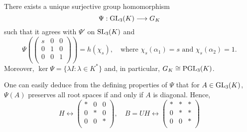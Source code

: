 \begin{theorem}
    There exists a unique surjective group homomorphism $$\Psi:\mathrm{GL}_3(K)\longrightarrow G_K$$ such that it agrees with $\Psi'$ on $\SL_3(K)$ and 
    $$\Psi\left(\begin{pmatrix}
        s & 0 & 0\\
        0 & 1 & 0\\
        0 & 0 & 1\\
    \end{pmatrix}\right)=h(\chi_s),\quad\text{where }\chi_s(\alpha_1)=s\text{ and }\chi_s(\alpha_2)=1.$$
    Moreover, $\ker\Psi=\{\lambda I:\lambda\in K^*\}$ and, in particular, $G_K\cong\mathrm{PGL}_3(K)$.
\end{theorem}

One can easily deduce from the defining properties of $\Psi$ that for $A\in\mathrm{GL}_3(K)$, $\Psi(A)$ preserves all root spaces if and only if $A$ is diagonal. Hence,
\begin{equation*}
    H \longleftrightarrow\begin{pmatrix}
        * & 0 & 0\\
        0 & * & 0\\
        0 & 0 & *\\
    \end{pmatrix},\quad B=UH\longleftrightarrow\begin{pmatrix}
        * & * & *\\
        0 & * & *\\
        0 & 0 & *\\
    \end{pmatrix}
\end{equation*}


\iffalse\begin{theorem}
    There exists a surjective group homomorphism $\Psi':\SL_3(K)\to G'$ such that 
    $$$$
    for all $A\in\SL_3(K)$ and $y\in\sliii(K)$. Moreover, $\ker\Psi'$ is the scalar multiples of the identity in $\SL_3(K)$.
\end{theorem}
\begin{proof}
    From \eqref{eq:exp}, we know that $\Psi'(I+te_\alpha)=x_\alpha(t)$ for all $\alpha\in\Phi$ and $t\in K$. Since these matrices generate $\SL_3(K)$ and the maps $x_\alpha(t)$ generate $G'$, the map is a well-defined surjective group homomorphism. Finally, it is clear that $\ker\Psi'=\{A\in\SL_3(K):Ay=yA\text{ for all }y\in\sliii(K)\}=Z(\SL_3(K))$, which are the scalar multiples of the identity.
\end{proof}\fi


